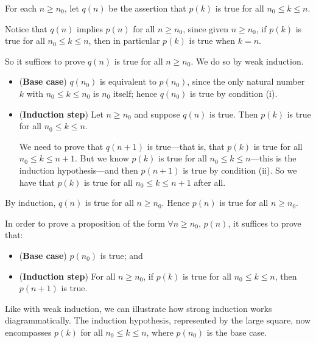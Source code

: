 \begin{cproof}
For each $n \ge n_0$, let $q(n)$ be the assertion that $p(k)$ is true for all $n_0 \le k \le n$.

Notice that $q(n)$ implies $p(n)$ for all $n \ge n_0$, since given $n \ge n_0$, if $p(k)$ is true for all $n_0 \le k \le n$, then in particular $p(k)$ is true when $k=n$.

So it suffices to prove $q(n)$ is true for all $n \ge n_0$.
We do so by weak induction.

\begin{itemize}
\item (\textbf{Base case}) $q(n_0)$ is equivalent to $p(n_0)$, since the only natural number $k$ with $n_0 \le k \le n_0$ is $n_0$ itself; hence $q(n_0)$ is true by condition (i).

\item (\textbf{Induction step}) Let $n \ge n_0$ and suppose $q(n)$ is true. Then $p(k)$ is true for all $n_0 \le k \le n$.

We need to prove that $q(n+1)$ is true---that is, that $p(k)$ is true for all $n_0 \le k \le n+1$. But we know $p(k)$ is true for all $n_0 \le k \le n$---this is the induction hypothesis---and then $p(n+1)$ is true by condition (ii). So we have that $p(k)$ is true for all $n_0 \le k \le n+1$ after all.
\end{itemize}
By induction, $q(n)$ is true for all $n \ge n_0$. Hence $p(n)$ is true for all $n \ge n_0$.
\end{cproof}

\begin{strategy}
\label{strStrongInduction}
In order to prove a proposition of the form $\forall n \ge n_0,\, p(n)$, it suffices to prove that:
\begin{itemize}
\item (\textbf{Base case}) $p(n_0)$ is true; and
\item (\textbf{Induction step}) For all $n \ge n_0$, if $p(k)$ is true for all $n_0 \le k \le n$, then $p(n+1)$ is true.
\end{itemize}
\end{strategy}

Like with weak induction, we can illustrate how strong induction works diagrammatically. The induction hypothesis, represented by the large square, now encompasses $p(k)$ for all $n_0 \le k \le n$, where $p(n_0)$ is the base case.


